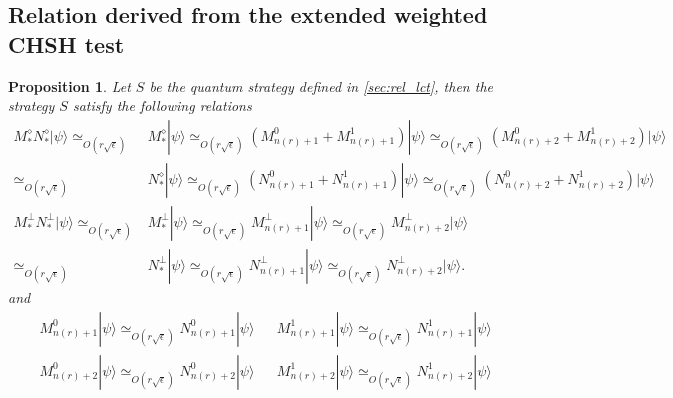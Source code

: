 \documentclass[11pt,letterpaper]{article}
\newcommand{\ket}[1]{|#1\rangle}
\newcommand{\1}{\mathbb{1}}
\newcommand{\nr}{n(r)}
\newcommand{\se}{\sqrt{\epsilon}}
\newcommand{\appd}[1]{\simeq_{#1}}
\newtheorem{proposition}[theorem]{Proposition}
\theoremstyle{definition}
\begin{document}
\subsection{Relation derived from the extended weighted CHSH test}
\label{sec:rel_chsh}
\begin{proposition}
Let $S$ be the quantum strategy defined in \cref{sec:rel_lct},
then the strategy $S$ satisfy the following relations
\begin{align}
	  M_\ast^\diamond N_\ast^\diamond \ket{\psi}
	  \appd{O( r\se)}&M_\ast^\diamond \ket{\psi} \appd{O( r\se)} (M_{\nr+1}^0+M_{\nr+1}^1)\ket{\psi} \appd{O( r\se)} (M_{\nr+2}^0+M_{\nr+2}^1)\ket{\psi} \\
	  \appd{O( r\se)}&N_\ast^\diamond \ket{\psi} \appd{O( r\se)} (N_{\nr+1}^0+N_{\nr+1}^1)\ket{\psi} \appd{O( r\se)} (N_{\nr+2}^0+N_{\nr+2}^1)\ket{\psi}\\
	M_\ast^\perp N_\ast^\perp\ket{\psi}\appd{O( r\se)} &M_\ast^\perp\ket{\psi} \appd{O( r\se)} M_{\nr+1}^\perp \ket{\psi} \appd{O( r\se)} M_{\nr+2}^\perp \ket{\psi}\\
	\appd{O( r\se)}&N_\ast^\perp\ket{\psi} \appd{O( r\se)} N_{\nr+1}^\perp \ket{\psi} \appd{O( r\se)} N_{\nr+2}^\perp \ket{\psi}.
\end{align}
and
\begin{align}
&M_{\nr+1}^0 \ket{\psi} \appd{O( r\se)} N_{\nr+1}^0 \ket{\psi} && M_{\nr+1}^1\ket{\psi} \appd{O( r\se)} N_{\nr+1}^1 \ket{\psi}\\
&M_{\nr+2}^0 \ket{\psi} \appd{O( r\se)} N_{\nr+2}^0 \ket{\psi} && M_{\nr+2}^1\ket{\psi} \appd{O( r\se)} N_{\nr+2}^1 \ket{\psi}
\end{align}
\end{proposition}
\end{document}
